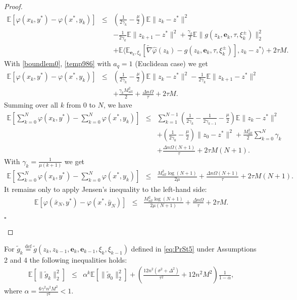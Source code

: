 \documentclass[runningheads]{llncs}
\def\eqdef{\overset{\text{def}}{=}}
\newcommand{\EndProof}{\begin{flushright}$\square$\end{flushright}}
\newcommand{\EE}{\mathbf{E}}
\def\EE{\mathbb E}
\begin{document}
\begin{proof}
\begin{eqnarray*}
    \EE[\varphi(x_k, y^*) - \varphi(x^*, y_k)]
    &\leq&
    \left(\frac{1}{2\gamma_k}- \frac{\mu}{2}\right)\EE\|z_k - z^*\|^2  \\
    && - \frac{1}{2\gamma_k}\EE\|z_{k+1} - z^*\|^2 + \frac{\gamma_k}{2}\EE\| g(z_k, \mathbf{e}_k, \tau,  \xi^{\pm}_k) \|^2_2 \\
    &&+ \EE\langle \EE_{\mathbf{e}_k, \xi_k}[\tilde \nabla \hat{\varphi}(z_k) - g(z_k, \mathbf{e}_k, \tau,  \xi^{\pm}_k)] , z_{k} - z^*\rangle + 2\tau M.
\end{eqnarray*}
With \eqref{boundlem0}, \eqref{temp986} with $a_q = 1$ (Euclidean case) we get
\begin{eqnarray*}
    \EE[\varphi(x_k, y^*) - \varphi(x^*, y_k)]
    &\leq&
    \left(\frac{1}{2\gamma_k}- \frac{\mu}{2}\right)\EE\|z_k - z^*\|^2 - \frac{1}{2\gamma_k}\EE\|z_{k+1} - z^*\|^2 \\
    &&+ \frac{\gamma_k M^2_{all}}{2} + \frac{\Delta n\Omega}{\tau} + 2\tau M.
\end{eqnarray*}
Summing over all $k$ from $0$ to $N$, we have
\begin{eqnarray*}
    \EE\left[\sum\limits_{k=0}^N\varphi(x_k, y^*) - \sum\limits_{k=0}^N\varphi(x^*, y_k)\right]
    &\leq&
    \sum\limits_{k=1}^{N-1} \left(\frac{1}{2\gamma_k} - \frac{1}{2\gamma_{k-1}} - \frac{\mu}{2}\right)\EE\|z_k - z^*\|^2\\
    &&+ \left(\frac{1}{2\gamma_0} - \frac{\mu}{2}\right) \|z_0 - z^*\|^2  + \frac{M^2_{all}}{2} \sum\limits_{k=0}^N \gamma_k \\
    &&+ \frac{\Delta n\Omega (N+1)}{\tau} + 2\tau M(N+1).
\end{eqnarray*}
With $\gamma_k = \frac{1}{\mu (k+1)}$ we get
\begin{eqnarray*}
    \EE\left[\sum\limits_{k=0}^N\varphi(x_k, y^*) - \sum\limits_{k=0}^N\varphi(x^*, y_k)\right]
    &\leq& \frac{M^2_{all} \log (N+1)}{2 \mu} + \frac{\Delta n\Omega (N+1)}{\tau} + 2\tau M(N+1).
\end{eqnarray*}
It remains only to apply Jensen's inequality to the left-hand side:
\begin{eqnarray*}
    \EE\left[\varphi(\bar x_N, y^*) - \varphi(x^*, \bar y_N)\right]
    &\leq& \frac{M^2_{all} \log (N+1)}{2 \mu(N+1)} + \frac{\Delta n\Omega}{\tau} + 2\tau M.
\end{eqnarray*}

\EndProof
\end{proof}


\begin{lemma}
    For $\tilde g_k \eqdef \tilde g(z_k, z_{k-1},  \mathbf{e}_k, \mathbf{e}_{k-1},  \xi_k, \xi_{k-1})$ defined in \eqref{eq:PrSt5} under Assumptions 2 and 4 the following inequalities holds:
    \begin{eqnarray*}
    \mathbb{E}\left[\|\tilde g_k\|^2_2\right] 
    &\leq& \alpha^k\mathbb{E}\left[\|\tilde g_{0}\|^2_2 \right] + \left(\frac{12n^2 (\sigma^2 + \Delta^2)}{\tau^2}+ 12n^2M^2\right) \frac{1}{1 - \alpha},
    \end{eqnarray*}
     where  $\alpha = \frac{6\gamma^2 n^2M^2}{\tau^2} < 1$.
\end{lemma}
\end{document}
